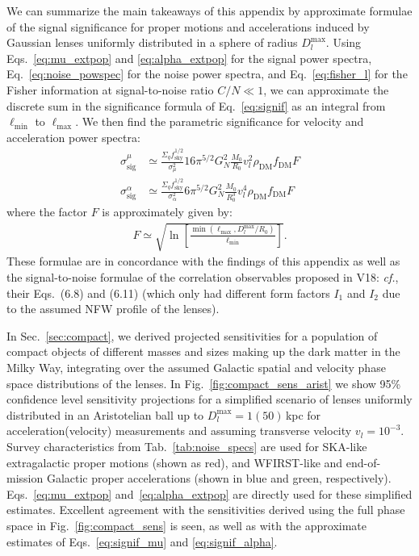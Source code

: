 \documentclass[prd,aps,twocolumn,nofootinbib,superscriptaddress,preprintnumbers,balancelastpage,longbibliography,floatfix]{revtex4-1}
\begin{document}
We can summarize the main takeaways of this appendix by approximate formulae of the signal significance for proper motions and accelerations induced by Gaussian lenses uniformly distributed in a sphere of radius $D_l^\mathrm{max}$. Using Eqs.~\ref{eq:mu_extpop} and \ref{eq:alpha_extpop} for the signal power spectra, Eq.~\ref{eq:noise_powspec} for the noise power spectra, and Eq.~\ref{eq:fisher_l} for the Fisher information at signal-to-noise ratio $C/N \ll 1$, we can approximate the discrete sum in the significance formula of Eq.~\ref{eq:signif} as an integral from $\ell_\mathrm{min}$ to $\ell_\mathrm{max}$. We then find the parametric significance for velocity and acceleration power spectra:
\begin{align}
\sigma_\mathrm{sig}^\mu &\simeq \frac{\Sigma_q f_\mathrm{sky}^{1/2}}{\sigma_\mu^2} 16 \pi^{5/2} G_N^2 \frac{M_0}{R_0} v_l^2 \rho_\mathrm{DM} f_\mathrm{DM} F \label{eq:signif_mu}\\
\sigma_\mathrm{sig}^\alpha &\simeq \frac{\Sigma_q f_\mathrm{sky}^{1/2}}{\sigma_\alpha^2} 6 \pi^{5/2} G_N^2 \frac{M_0}{R_0^3} v_l^4 \rho_\mathrm{DM} f_\mathrm{DM} F  \label{eq:signif_alpha}
\end{align}
where the factor $F$ is approximately given by:
\begin{align}
F \simeq \sqrt{\ln\left[\frac{\min\left( \ell_\mathrm{max}, D_l^\mathrm{max}/R_0\right)}{\ell_\mathrm{min}} \right]}.
\end{align}
These formulae are in concordance with the findings of this appendix as well as the signal-to-noise formulae of the correlation observables proposed in V18: \emph{cf.}, their Eqs.~(6.8) and (6.11) (which only had different form factors $I_1$ and $I_2$ due to the assumed NFW profile of the lenses).

In Sec.~\ref{sec:compact}, we derived projected sensitivities for a population of compact objects of different masses and sizes making up the dark matter in the Milky Way, integrating over the assumed Galactic spatial and velocity phase space distributions of the lenses. In Fig.~\ref{fig:compact_sens_arist} we show 95\% confidence level sensitivity projections for a simplified scenario of lenses uniformly distributed in an Aristotelian ball up to $D_l^{\mathrm{max}} = 1(50)$\,kpc for acceleration(velocity) measurements and assuming transverse velocity $v_l=10^{-3}$. Survey characteristics from Tab.~\ref{tab:noise_specs} are used for SKA-like extragalactic proper motions (shown as red), and WFIRST-like and end-of-mission \Gaia Galactic proper accelerations (shown in blue and green, respectively). Eqs.~\eqref{eq:mu_extpop} and~\eqref{eq:alpha_extpop} are directly used for these simplified estimates. Excellent agreement with the sensitivities derived using the full phase space in Fig.~\ref{fig:compact_sens} is seen, as well as with the approximate estimates of Eqs.~\ref{eq:signif_mu} and \ref{eq:signif_alpha}.
\end{document}
